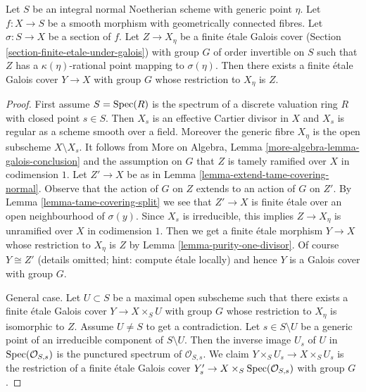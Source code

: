 \begin{lemma}
\label{lemma-extend-covering}
Let $S$ be an integral normal Noetherian scheme with generic point $\eta$.
Let $f : X \to S$ be a smooth morphism with geometrically connected fibres.
Let $\sigma : S \to X$ be a section of $f$. Let $Z \to X_\eta$ be a
finite \'etale Galois cover (Section \ref{section-finite-etale-under-galois})
with group $G$ of order invertible on $S$ such that
$Z$ has a $\kappa(\eta)$-rational point mapping to $\sigma(\eta)$.
Then there exists a finite \'etale Galois cover $Y \to X$ with group $G$
whose restriction to $X_\eta$ is $Z$.
\end{lemma}

\begin{proof}
First assume $S = \mathop{\mathrm{Spec}}(R)$ is the spectrum of a discrete valuation ring $R$
with closed point $s \in S$. Then $X_s$ is an effective Cartier
divisor in $X$ and $X_s$ is regular as a scheme smooth over a field.
Moreover the generic fibre $X_\eta$ is the open subscheme $X \setminus X_s$.
It follows from
More on Algebra, Lemma \ref{more-algebra-lemma-galois-conclusion}
and the assumption on $G$ that $Z$ is tamely ramified
over $X$ in codimension $1$. Let $Z' \to X$ be as in
Lemma \ref{lemma-extend-tame-covering-normal}. Observe that
the action of $G$ on $Z$ extends to an action of $G$ on $Z'$.
By Lemma \ref{lemma-tame-covering-split}
we see that $Z' \to X$ is finite \'etale over an open
neighbourhood of $\sigma(y)$.
Since $X_s$ is irreducible, this implies $Z \to X_\eta$
is unramified over $X$ in codimension $1$.
Then we get a finite \'etale morphism $Y \to X$
whose restriction to $X_\eta$ is $Z$ by
Lemma \ref{lemma-purity-one-divisor}.
Of course $Y \cong Z'$ (details omitted; hint: compute \'etale locally)
and hence $Y$ is a Galois cover with group $G$.

\medskip\noindent
General case. Let $U \subset S$ be a maximal open subscheme
such that there exists a finite \'etale Galois cover
$Y \to X \times_S U$ with group $G$
whose restriction to $X_\eta$ is isomorphic to $Z$.
Assume $U \not = S$ to get a contradiction.
Let $s \in S \setminus U$ be a generic point of an irreducible
component of $S \setminus U$. Then the inverse image $U_s$
of $U$ in $\mathop{\mathrm{Spec}}(\mathcal{O}_{S, s})$
is the punctured spectrum of $\mathcal{O}_{S, s}$.
We claim $Y \times_S U_s \to X \times_S U_s$
is the restriction of a finite \'etale Galois cover
$Y'_s \to X \times_S \mathop{\mathrm{Spec}}(\mathcal{O}_{S, s})$
with group $G$.


\end{proof}
